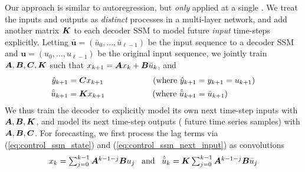  Our approach is similar to autoregression, but \emph{only} applied at a single \ourmethodunit{}. We treat the inputs and outputs as \emph{distinct} processes in a multi-layer network, and add another matrix $\boldsymbol{K}$  to each decoder SSM to model future \emph{input} time-steps explicitly.
Letting $\bar{\boldsymbol{u}} = (\bar{u}_0, \ldots, \bar{u}_{\ell - 1})$ be the input sequence to a decoder SSM and $\boldsymbol{u} = (u_0, \ldots, u_{\ell - 1})$ be the original input sequence,
we jointly train
$\boldsymbol{A}, \boldsymbol{B}, \boldsymbol{C}, \boldsymbol{K}$ such that $x_{k + 1} = \boldsymbol{A} x_{k} + \boldsymbol{B} \bar{u}_{k}$, and
\begin{align}
    \hat{y}_{k + 1} &= \boldsymbol{C} x_{k + 1} 
    \>\>\>\>\>\>\>\>\>\>\>\>\>\>\>\>\>\>\>\>\>\>\>\>\>\>\>
    \text{(where $\hat{y}_{k + 1} = y_{k + 1} = u_{k + 1}$)} \label{eq:control_ssm_state}  \\
    \hat{\bar{u}}_{k + 1} &= \boldsymbol{K} x_{k + 1} 
    \>\>\>\>\>\>\>\>\>\>\>\>\>\>\>\>\>\>\>\>\>\>\>\>\>\>
    \text{(where $\hat{\bar{u}}_{k + 1} = \bar{u}_{k + 1}$)} \label{eq:control_ssm_next_input}
\end{align}
We thus train the decoder \ourmethodunit{} to explicitly model its own next time-step inputs with $\boldsymbol{A}, \boldsymbol{B}, \boldsymbol{K}$, and model its next time-step outputs (\ie{} future time series samples) with $\boldsymbol{A}, \boldsymbol{B}, \boldsymbol{C}$. 
%
For forecasting, we first process the lag terms via (\ref{eq:control_ssm_state}) and (\ref{eq:control_ssm_next_input}) as convolutions
\begin{equation}
    x_{k} =  \textstyle \sum_{j = 0}^{k - 1}\boldsymbol{A}^{k - 1 - j} \boldsymbol{B} u_j \;\;\;\text{and}\;\;\;
    \hat{\bar{u}}_{k} = \boldsymbol{K} \textstyle  \sum_{j = 0}^{k - 1}\boldsymbol{A}^{k - 1 - j} \boldsymbol{B} \bar{u}_j
\label{eq:convolution_output_multilayer}
\end{equation}
